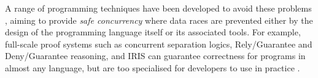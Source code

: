 A range of programming techniques have been developed to avoid these problems
\cite{lea98,concurrentHard}, aiming to provide \textit{safe
  concurrency} where data races are prevented either by the design  of the
programming language itself or its associated tools.
%
For example, full-scale proof systems
such as concurrent separation logics\cite{JacobsEA05,chalice},
Rely/Guarantee\cite{jonesTOPLAS83,MPC-Staden15,concur2007} and
Deny/Guarantee\cite{DenyGuarantee} reasoning, and IRIS\cite{dd}
can guarantee correctness for programs in almost any language,
but are too specialised for developers to use in practice
\cite{fonesca2017,shriramFormal2019}.

